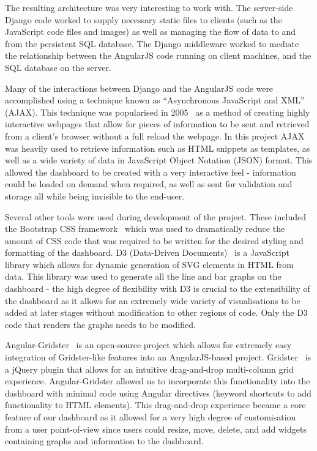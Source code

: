 \documentclass{l3proj}
\begin{document}
The resulting architecture was very interesting to work with. The server-side Django code worked to supply necessary static files to clients (such as the JavaScript code files and images) as well as managing the flow of data to and from the persistent SQL database. The Django middleware worked to mediate the relationship between the AngularJS code running on client machines, and the SQL database on the server.

Many of the interactions between Django and the AngularJS code were accomplished using a technique known as ``Asynchronous JavaScript and XML'' (AJAX). This technique was popularised in 2005~\cite{ANewApproachToWebApplications, W3CAjaxProposal} as a method of creating highly interactive webpages that allow for pieces of information to be sent and retrieved from a client's browser without a full reload the webpage. In this project AJAX was heavily used to retrieve information such as HTML snippets as templates, as well as a wide variety of data in JavaScript Object Notation (JSON) format. This allowed the dashboard to be created with a very interactive feel - information could be loaded on demand when required, as well as sent for validation and storage all while being invisible to the end-user.

Several other tools were used during development of the project. These included the Bootstrap CSS framework~\cite{Bootstrap} which was used to dramatically reduce the amount of CSS code that was required to be written for the desired styling and formatting of the dashboard. D3 (Data-Driven Documents)~\cite{d3Webpage} is a JavaScript library which allows for dynamic generation of SVG elements in HTML from data. This library was used to generate all the line and bar graphs on the dashboard - the high degree of flexibility with D3 is crucial to the extensibility of the dashboard as it allows for an extremely wide variety of visualisations to be added at later stages without modification to other regions of code. Only the D3 code that renders the graphs needs to be modified.

Angular-Gridster~\cite{AngularGridster} is an open-source project which allows for extremely easy integration of Gridster-like features into an AngularJS-based project. Gridster~\cite{Gridster} is a jQuery plugin that allows for an intuitive drag-and-drop multi-column grid experience. Angular-Gridster allowed us to incorporate this functionality into the dashboard with minimal code using Angular directives (keyword shortcuts to add functionality to HTML elements). This drag-and-drop experience became a core feature of our dashboard as it allowed for a very high degree of customisation from a user point-of-view since users could resize, move, delete, and add widgets containing graphs and information to the dashboard.
\end{document}
